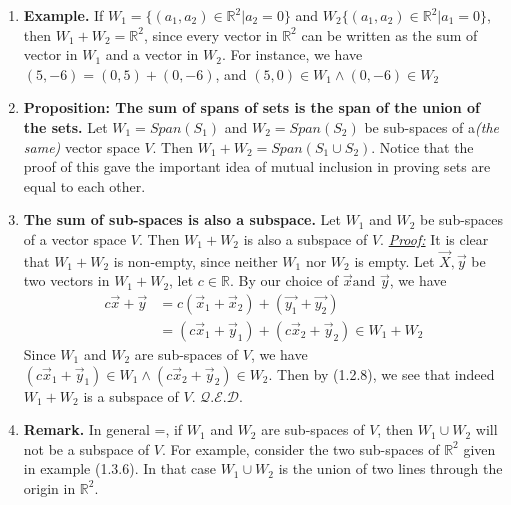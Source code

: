 \documentclass[oneside, 12pt]{book}
\newcommand{\settag}[1]{\renewcommand{\theenumi}{#1}}
\newcommand{\R}{\mathbb{R}}
\newcommand{\qed}{\hfill $\mathcal{Q}.\mathcal{E}.\mathcal{D}.$}
\begin{document}
\begin{enumerate}
        \settag{1.3.6}
        \item \textbf{Example.} If $W_1 = \{(a_1, a_2)\in \R^2|a_2 = 0\}$ and $W_2 \{(a_1, a_2)\in \R^2|a_1 = 0\}$, then $W_1 + W_2= \R^2$, since every vector in $\R^2$ can be written as the sum of vector in $W_1$ and a vector in $W_2$. For instance, we have $(5, -6)=(0, 5)+(0, -6)$, and $(5, 0)\in W_1 \wedge (0, -6)\in W_2$
        
        
        \settag{1.3.8} 
        \item \textbf{Proposition: The sum of spans of sets is the span of the union of the sets.} Let $W_1 = Span(S_1)$ and $W_2 = Span(S_2)$ be sub-spaces of a\textit{(the same)} vector space $V$. Then $W_1 + W_2 = Span(S_1 \cup S_2)$. Notice that the proof of this gave the important idea of mutual inclusion in proving sets are equal to each other.
        
        \settag{1.3.9}
        \item \textbf{The sum of sub-spaces is also a subspace.} Let $W_1$ and $W_2$ be sub-spaces of a vector space $V$. Then $W_1 + W_2$ is also a subspace of $V$.\newline
        \underline{\textit{Proof:}}\newline
        It is clear that $W_1 + W_2$ is non-empty, since neither $W_1$ nor $W_2$ is empty. Let $\vec{X}, \vec{y}$ be two vectors in $W_1+W_2$, let $c\in \R$. By our choice of $\vec{x}\text{and } \vec{y}$, we have
        \begin{align*}
            c\vec{x} + \vec{y} & = c(\vec{x}_1 + \vec{x}_2) + (\vec{y_1} + \vec{y_2}) \\
            & = (c\vec{x}_1 + \vec{y}_1) + (c\vec{x}_2 + \vec{y}_2) \in W_1+W_2
        \end{align*}
        Since $W_1$ and $W_2$ are sub-spaces of $V$, we have $(c\vec{x}_1 + \vec{y}_1) \in W_1\wedge (c\vec{x}_2 + \vec{y}_2)\in W_2$. Then by (1.2.8), we see that indeed $W_1 + W_2$ is a subspace of $V$. \qed
        
        \settag{1.3.10}
        \item \textbf{Remark.} In general =, if $W_1$ and $W_2$ are sub-spaces of $V$, then $W_1 \cup W_2$ will not be a subspace of $V$. For example, consider the two sub-spaces of $\R^2$ given in example (1.3.6). In that case $W_1\cup W_2$ is the union of two lines through the origin in $\R^2$. 
        

\end{enumerate}
\end{document}
